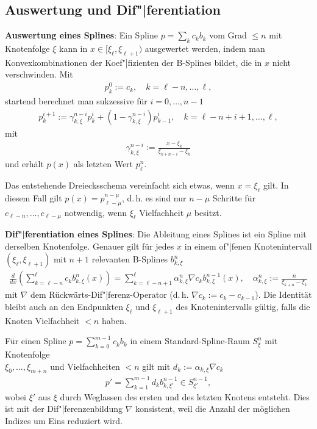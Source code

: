 \subsection{%
    Auswertung und Dif"|ferentiation%
}

\textbf{Auswertung eines Splines}:
Ein Spline $p = \sum_k c_k b_k$ vom Grad $\le n$ mit Knotenfolge $\xi$ kann in
$x \in [\xi_\ell, \xi_{\ell+1})$ ausgewertet werden, indem man
Konvexkombinationen der Koef"|fizienten der B-Splines bildet, die in $x$ nicht verschwinden.
Mit
\begin{align*}
    p_k^0 := c_k,\quad
    k = \ell - n, \dotsc, \ell,
\end{align*}
startend berechnet man sukzessive für $i = 0, \dotsc, n - 1$
\begin{align*}
    p_k^{i+1} := \gamma_{k,\xi}^{n-i} p_k^i + (1 - \gamma_{k,\xi}^{n-i}) p_{k-1}^i,\quad
    k = \ell - n + i + 1, \dotsc, \ell,
\end{align*}
mit
\begin{align*}
    \gamma_{k,\xi}^{n-i} := \frac{x - \xi_k}{\xi_{k+n-i} - \xi_k}
\end{align*}
und erhält $p(x)$ als letzten Wert $p_\ell^n$.

Das entstehende Dreiecksschema vereinfacht sich etwas, wenn $x = \xi_\ell$ gilt.
In diesem Fall gilt $p(x) = p_{\ell-\mu}^{n-\mu}$, d.\,h.
es sind nur $n - \mu$ Schritte für $c_{\ell-n}, \dotsc, c_{\ell-\mu}$ notwendig,
wenn $\xi_\ell$ Vielfachheit $\mu$ besitzt.

\linie
\pagebreak

\textbf{Dif"|ferentiation eines Splines}:
Die Ableitung eines Splines ist ein Spline mit derselben Knotenfolge.
Genauer gilt für jedes $x$ in einem of"|fenen Knotenintervall $(\xi_\ell, \xi_{\ell+1})$
mit $n + 1$ relevanten B-Splines $b_{k,\xi}^n$
\begin{align*}
    \frac{d}{dx} \left(\sum_{k=\ell-n}^\ell c_k b_{k,\xi}^n(x)\right)
    = \sum_{k=\ell-n+1}^\ell \alpha_{k,\xi}^n \nabla c_k b_{k,\xi}^{n-1}(x),\quad
    \alpha_{k,\xi}^n := \frac{n}{\xi_{k+n} - \xi_k}
\end{align*}
mit $\nabla$ dem Rückwärts-Dif"|ferenz-Operator (d.\,h. $\nabla c_k := c_k - c_{k-1}$).
Die Identität bleibt auch an den Endpunkten $\xi_\ell$ und $\xi_{\ell+1}$ des Knotenintervalls
gültig, falls die Knoten Vielfachheit $< n$ haben.

Für einen Spline $p = \sum_{k=0}^{m-1} c_k b_k$ in einem Standard-Spline-Raum $S_\xi^n$ mit
Knotenfolge\\
$\xi_0, \dotsc, \xi_{m+n}$ und Vielfachheiten $< n$ gilt
mit $d_k := \alpha_{k,\xi} \nabla c_k$
\begin{align*}
    p' = \sum_{k=1}^{m-1} d_k b_{k,\xi'}^{n-1} \in S_{\xi'}^{n-1},
\end{align*}
wobei $\xi'$ aus $\xi$ durch Weglassen des ersten und des letzten Knotens entsteht.
Dies ist mit der Dif"|ferenzenbildung $\nabla$ konsistent, weil die Anzahl der möglichen Indizes
um Eins reduziert wird.

